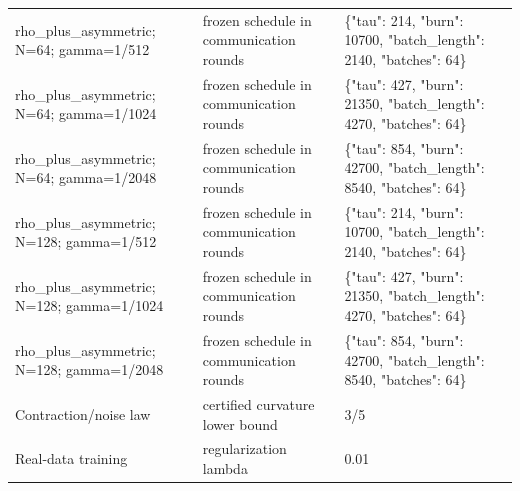 \begin{tabular}{lll}
rho\_plus\_asymmetric; N=64; gamma=1/512 & frozen schedule in communication rounds & \{"tau": 214, "burn": 10700, "batch\_length": 2140, "batches": 64\} \\
rho\_plus\_asymmetric; N=64; gamma=1/1024 & frozen schedule in communication rounds & \{"tau": 427, "burn": 21350, "batch\_length": 4270, "batches": 64\} \\
rho\_plus\_asymmetric; N=64; gamma=1/2048 & frozen schedule in communication rounds & \{"tau": 854, "burn": 42700, "batch\_length": 8540, "batches": 64\} \\
rho\_plus\_asymmetric; N=128; gamma=1/512 & frozen schedule in communication rounds & \{"tau": 214, "burn": 10700, "batch\_length": 2140, "batches": 64\} \\
rho\_plus\_asymmetric; N=128; gamma=1/1024 & frozen schedule in communication rounds & \{"tau": 427, "burn": 21350, "batch\_length": 4270, "batches": 64\} \\
rho\_plus\_asymmetric; N=128; gamma=1/2048 & frozen schedule in communication rounds & \{"tau": 854, "burn": 42700, "batch\_length": 8540, "batches": 64\} \\
Contraction/noise law & certified curvature lower bound & 3/5 \\
Real-data training & regularization lambda & 0.01 \\
\end{tabular}
